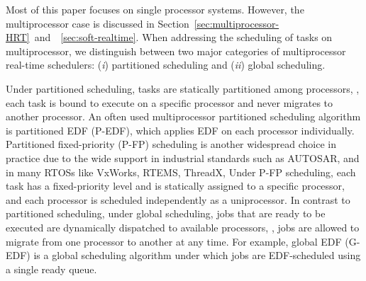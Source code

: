 

Most of this paper focuses on single processor systems. However, the multiprocessor case is discussed in Section~\ref{sec:multiprocessor-HRT}~and~\mysectionref{}~\ref{sec:soft-realtime}. When addressing the scheduling of tasks on multiprocessor, we distinguish between two major categories of multiprocessor real-time schedulers:  (\textit{i}) partitioned scheduling and (\textit{ii}) global scheduling. 

Under partitioned scheduling, tasks are statically partitioned among processors, \ie, each task is bound to execute on a specific processor and never migrates to another processor. An often used multiprocessor partitioned scheduling algorithm is partitioned EDF (P-EDF), which applies EDF on each processor individually.
Partitioned fixed-priority (P-FP) scheduling is another widespread
choice in practice due to the wide support in industrial standards
such as AUTOSAR, and in many RTOSs like VxWorks, RTEMS, ThreadX, \etc
Under P-FP scheduling, each task has a fixed-priority level and is statically assigned to a specific processor, and each processor is scheduled independently as a uniprocessor.  
 In contrast to partitioned scheduling, under global scheduling, jobs that are ready to be executed are dynamically dispatched to available processors, \ie, jobs are allowed to migrate from one processor to another at any time. For example, global EDF (G-EDF) is a global scheduling algorithm under which jobs are EDF-scheduled using a single ready queue.



